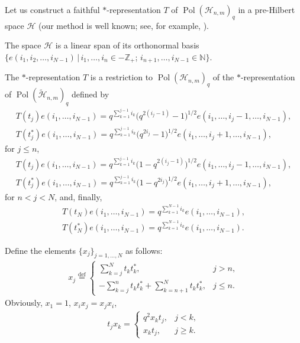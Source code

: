 Let us construct a faithful $*$-representation $T$ of $\operatorname{Pol}(\mathscr{H}_{n,m})_q$ in a
pre-Hilbert space $\mathscr{H}$ (our method is well known; see, for example, \cite{polmat}).

The space $\mathscr{H}$ is a linear span of its orthonormal basis
$\{e(i_1,i_2,\ldots,i_{N-1})\, |\,i_1,\ldots,i_n\in-\mathbb{Z}_+$; $i_{n+1}, \ldots,i_{N-1}\in\mathbb{N}\}$.

The $*$-representation $T$ is a restriction to $\operatorname{Pol}(\mathscr{H}_{n,m})_q$ of the
$*$-representation of $\operatorname{Pol}(\widetilde{\mathscr{H}}_{n,m})_q$ def\/ined by
\begin{gather*}
T(t_j)e(i_1,\ldots,i_{N-1})  = q^{\sum\limits_{k=1}^{j-1}i_k} \big(q^{2(i_j-1)}-1\big)^{1/2}
e(i_1,\ldots,i_j-1,\ldots,i_{N-1}),
\\ T(t_j^*)e(i_1,\ldots,i_{N-1})  =
q^{\sum\limits_{k=1}^{j-1}i_k} \big(q^{2i_j}-1\big)^{1/2} e(i_1,\ldots,i_j+1,\ldots,i_{N-1}),
\end{gather*}
for $j\le n$,
\begin{gather*}
T(t_j)e(i_1,\ldots,i_{N-1})  = q^{\sum\limits_{k=1}^{j-1}i_k} \big(1-q^{2(i_j-1)}\big)^{1/2}
e(i_1,\ldots,i_j-1,\ldots,i_{N-1}),
\\ T(t_j^*)e(i_1,\ldots,i_{N-1})  =
q^{\sum\limits_{k=1}^{j-1}i_k} \big(1-q^{2i_j}\big)^{1/2} e(i_1,\ldots,i_j+1,\ldots,i_{N-1}),
\end{gather*}
for $n<j<N$, and, f\/inally,
\begin{gather*}
T(t_N)e(i_1,\ldots,i_{N-1})  = q^{\sum\limits_{k=1}^{N-1}i_k}e(i_1,\ldots,i_{N-1}),
\\ T(t_N^*)e(i_1,\ldots,i_{N-1})  =
q^{\sum\limits_{k=1}^{N-1}i_k}e(i_1,\ldots,i_{N-1}).
\end{gather*}

Def\/ine the elements $\{x_j\}_{j=1,\ldots,N}$ as follows:
\begin{gather}\label{x_j}
x_j\overset{\mathrm{def}}{=}
\begin{cases}
\sum\limits_{k=j}^Nt_kt_k^*, & j>n,
\\ -\sum\limits_{k=j}^nt_kt_k^*+\sum\limits_{k=n+1}^Nt_kt_k^*, & j\le n.
\end{cases}
\end{gather}
Obviously, $x_1=1$, $x_ix_j=x_jx_i$,
\begin{gather}\label{t_jx_k}
t_jx_k=
\begin{cases}
q^2x_kt_j, & j<k,
\\ x_kt_j, & j\ge k.
\end{cases}
\end{gather}

